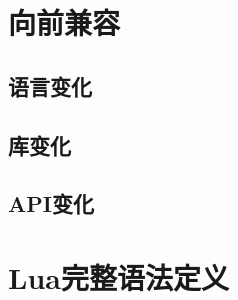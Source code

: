 \documentclass{ctexart}
\begin{document}
\section{向前兼容}

\subsection{语言变化}

\subsection{库变化}

\subsection{API变化}

\section{Lua完整语法定义}
\end{document}
